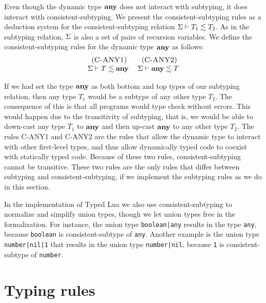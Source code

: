 Even though the dynamic type $\mathbf{any}$ does not interact with subtyping,
it does interact with consistent-subtyping.
We present the consistent-subtyping rules as a deduction system for
the consistent-subtyping relation $\Sigma \vdash T_{1} \lesssim T_{2}$.
As in the subtyping relation, $\Sigma$ is also a set of pairs of
recursion variables.
We define the consistent-subtyping rules for the dynamic type $\mathbf{any}$
as follows:
\[
\begin{array}{c}
\begin{array}{c}
\; (\textsc{C-ANY1})\\
\Sigma \vdash T \lesssim \mathbf{any}
\end{array}
\;
\begin{array}{c}
\; (\textsc{C-ANY2})\\
\Sigma \vdash \mathbf{any} \lesssim T
\end{array}
\end{array}
\]

If we had set the type $\mathbf{any}$ as both bottom and top types of our
subtyping relation, then any type $T_{1}$ would be a subtype of
any other type $T_{2}$.
The consequence of this is that all programs would type check without errors.
This would happen due to the transitivity of subtyping, that is,
we would be able to down-cast any type $T_{1}$ to $\mathbf{any}$ and then up-cast
$\mathbf{any}$ to any other type $T_{2}$.
The rules \textsc{C-ANY1} and \textsc{C-ANY2} are the rules that
allow the dynamic type to interact with other first-level types,
and thus allow dynamically typed code to coexist with statically
typed code.
Because of these two rules, consistent-subtyping cannot be transitive.
These two rules are the only rules that differ between
subtyping and consistent-subtyping, if we implement the subtyping rules
as we do in this section.

In the implementation of Typed Lua we also use consistent-subtyping to
normalize and simplify union types, though we let union types free in
the formalization.
For instance, the union type \texttt{boolean|any} results in the
type \texttt{any}, because \texttt{boolean} is consistent-subtype
of \texttt{any}.
Another example is the union type \texttt{number|nil|1} that
results in the union type \texttt{number|nil}, because
\texttt{1} is consistent-subtype of \texttt{number}.

\section{Typing rules}
\label{sec:rules}

